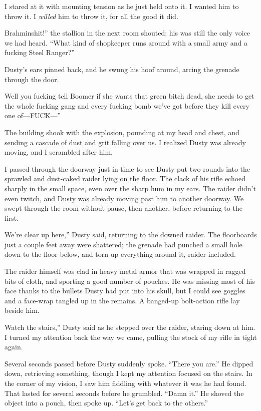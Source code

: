 I stared at it with mounting tension as he just held onto it. I wanted him to throw it. I \textit{willed} him to throw it, for all the good it did.

\leavevmode{}Brahminshit!” the stallion in the next room shouted; his was still the only voice we had heard. “What kind of shopkeeper runs around with a small army and a fucking Steel Ranger?”

Dusty’s ears pinned back, and he swung his hoof around, arcing the grenade through the door.

\leavevmode{}Well you fucking tell Boomer if she wants that green bitch dead, she needs to get the whole fucking gang and every fucking bomb we’ve got before they kill every one of—FUCK—”

The building shook with the explosion, pounding at my head and chest, and sending a cascade of dust and grit falling over us. I realized Dusty was already moving, and I scrambled after him.

I passed through the doorway just in time to see Dusty put two rounds into the sprawled and dust-caked raider lying on the floor. The clack of his rifle echoed sharply in the small space, even over the sharp hum in my ears. The raider didn’t even twitch, and Dusty was already moving past him to another doorway. We swept through the room without pause, then another, before returning to the first.

\leavevmode{}We’re clear up here,” Dusty said, returning to the downed raider. The floorboards just a couple feet away were shattered; the grenade had punched a small hole down to the floor below, and torn up everything around it, raider included.

The raider himself was clad in heavy metal armor that was wrapped in ragged bits of cloth, and sporting a good number of pouches. He was missing most of his face thanks to the bullets Dusty had put into his skull, but I could see goggles and a face-wrap tangled up in the remains. A banged-up bolt-action rifle lay beside him.

\leavevmode{}Watch the stairs,” Dusty said as he stepped over the raider, staring down at him. I turned my attention back the way we came, pulling the stock of my rifle in tight again.

Several seconds passed before Dusty suddenly spoke. “There you are.” He dipped down, retrieving something, though I kept my attention focused on the stairs. In the corner of my vision, I saw him fiddling with whatever it was he had found. That lasted for several seconds before he grumbled. “Damn it.” He shoved the object into a pouch, then spoke up. “Let’s get back to the others.”

